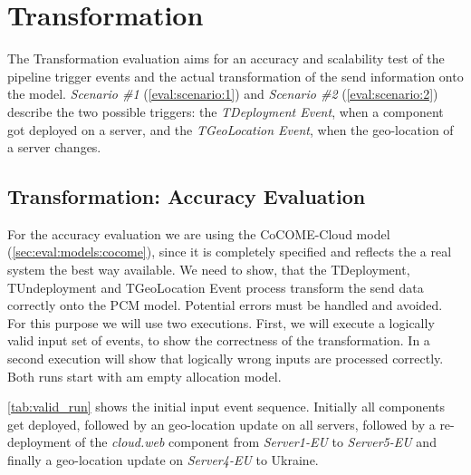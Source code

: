 \section{Transformation}
\label{sec:Evaluation:monitoring}

The Transformation evaluation aims for an accuracy and scalability test of the pipeline trigger events and the actual transformation of the send information onto the model. \textit{Scenario \#1} (\autoref{eval:scenario:1}) and \textit{Scenario \#2} (\autoref{eval:scenario:2}) describe the two possible triggers: the \textit{TDeployment Event}, when a component got deployed on a server, and the \textit{TGeoLocation Event}, when the geo-location of a server changes. 

\subsection{Transformation: Accuracy Evaluation}

For the accuracy evaluation we are using the CoCOME-Cloud model (\autoref{sec:eval:models:cocome}), since it is completely specified and reflects the a real system the best way available. We need to show, that the TDeployment, TUndeployment and TGeoLocation Event process transform the send data correctly onto the PCM model. Potential errors must be handled and avoided. For this purpose we will use two executions. First, we will execute a logically valid input set of events, to show the correctness of the transformation. In a second execution will show that logically wrong inputs are processed correctly. Both runs start with am empty allocation model.

\autoref{tab:valid_run} shows the initial input event sequence. Initially all components get deployed, followed by an geo-location update on all servers, followed by a re-deployment of the \textit{cloud.web} component from \textit{Server1-EU} to \textit{Server5-EU} and finally a geo-location update on \textit{Server4-EU} to Ukraine.

